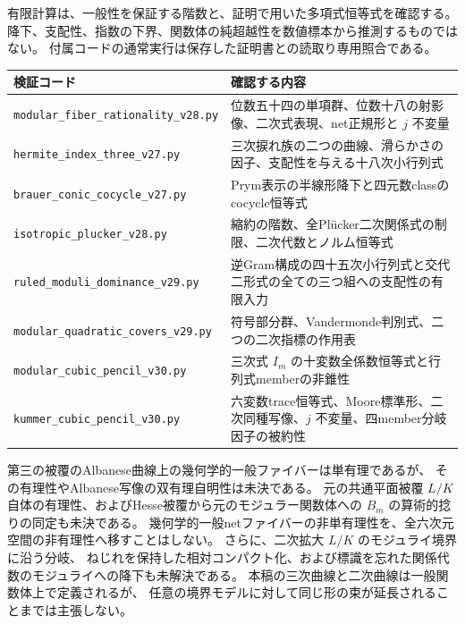 有限計算は、一般性を保証する階数と、証明で用いた多項式恒等式を確認する。
降下、支配性、指数の下界、関数体の純超越性を数値標本から推測するものではない。
付属コードの通常実行は保存した証明書との読取り専用照合である。
\begin{longtable}{@{}p{.45\linewidth}p{.50\linewidth}@{}}
\toprule 検証コード&確認する内容\\\midrule
\nolinkurl{modular_fiber_rationality_v28.py}&位数五十四の単項群、位数十八の射影像、二次式表現、net正規形と $j$ 不変量\\
\nolinkurl{hermite_index_three_v27.py}&三次捩れ族の二つの曲線、滑らかさの因子、支配性を与える十八次小行列式\\
\nolinkurl{brauer_conic_cocycle_v27.py}&Prym表示の半線形降下と四元数classのcocycle恒等式\\
\nolinkurl{isotropic_plucker_v28.py}&縮約の階数、全Pl\"ucker二次関係式の制限、二次代数とノルム恒等式\\
\nolinkurl{ruled_moduli_dominance_v29.py}&逆Gram構成の四十五次小行列式と交代二形式の全ての三つ組への支配性の有限入力\\
\nolinkurl{modular_quadratic_covers_v29.py}&符号部分群、Vandermonde判別式、二つの二次指標の作用表\\
\nolinkurl{modular_cubic_pencil_v30.py}&三次式 $I_m$ の十変数全係数恒等式と行列式memberの非錐性\\
\nolinkurl{kummer_cubic_pencil_v30.py}&六変数trace恒等式、Moore標準形、二次同種写像、$j$ 不変量、四member分岐因子の被約性\\
\bottomrule
\end{longtable}

第三の被覆のAlbanese曲線上の幾何学的一般ファイバーは単有理であるが、
その有理性やAlbanese写像の双有理自明性は未決である。
元の共通平面被覆 $L/K$ 自体の有理性、およびHesse被覆から元のモジュラー関数体への
$B_m$ の算術的捻りの同定も未決である。
幾何学的一般netファイバーの非単有理性を、全六次元空間の非有理性へ移すことはしない。
さらに、二次拡大 $L/K$ のモジュライ境界に沿う分岐、
ねじれを保持した相対コンパクト化、および標識を忘れた関係代数のモジュライへの降下も未解決である。
本稿の三次曲線と二次曲線は一般関数体上で定義されるが、
任意の境界モデルに対して同じ形の束が延長されることまでは主張しない。

